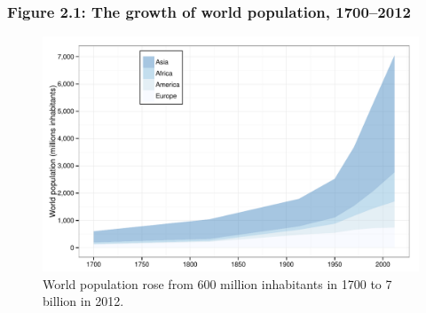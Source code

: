 \documentclass[t]{beamer}\usepackage[]{graphicx}\usepackage[]{color}
\newenvironment{knitrout}{}{} %
\begin{document}
\begin{frame}[label=Figure_2_1b]
\frametitle{Figure 2.1: The growth of world population, 1700--2012}
\begin{figure}[t]
\begin{minipage}[b]{\textwidth}
\centering
\begin{knitrout}\footnotesize
{}\color{fgcolor}

{\centering \includegraphics[width=1\linewidth]{figures/color/Figure_2_1b} 

}



\end{knitrout}
\caption{World population rose from 600 million inhabitants in 1700 to 7 billion in 2012.}
\end{minipage}
\end{figure}
\end{frame}
\end{document}
